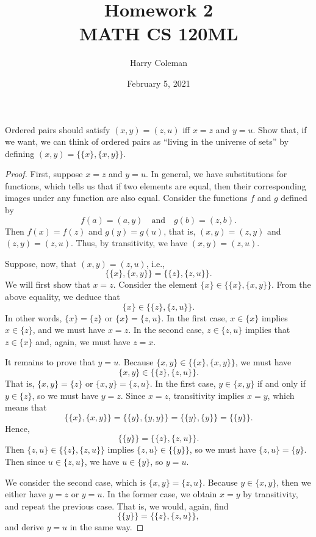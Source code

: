 \documentclass[12pt]{article}
\title{Homework 2\\
    \large MATH CS 120ML
}
\author{Harry Coleman}
\date{February 5, 2021}
\newenvironment{pbox}
    {\begin{lrbox}{\mybox}\begin{minipage}{0.98\textwidth}}
    {\end{minipage}\end{lrbox}\begin{center}\framebox[\textwidth]{\usebox{\mybox}}\end{center}}
\theoremstyle{definition}
\newcommand{\isp}[1]{\quad\text{#1}\quad}
\begin{document}
\maketitle

\section{}
\begin{pbox}
    Ordered pairs should satisfy $(x, y) = (z, u)$ iff $x = z$ and $y = u$. Show that, if we want, we can think of ordered pairs as ``living in the universe of sets'' by defining $(x, y) = \{\{x\}, \{x, y\}\}$.
\end{pbox}

\begin{proof}
    First, suppose $x = z$ and $y = u$. In general, we have substitutions for functions, which tells us that if two elements are equal, then their corresponding images under any function are also equal.  Consider the functions $f$ and $g$ defined by
    \[
        f(a) = (a, y) \isp{and} g(b) = (z, b).
    \]
    Then $f(x) = f(z)$ and $g(y) = g(u)$, that is, $(x, y) = (z, y)$ and $(z, y) = (z, u)$. Thus, by transitivity, we have $(x, y) = (z, u)$.
    
    Suppose, now, that $(x, y) = (z, u)$, i.e.,
    \[
        \{\{x\}, \{x, y\}\} = \{\{z\}, \{z, u\}\}.
    \]
    We will first show that $x = z$. Consider the element $\{x\} \in \{\{x\}, \{x, y\}\}$. From the above equality, we deduce that
    \[
         \{x\} \in \{\{z\}, \{z, u\}\}.
    \]
    In other words, $\{x\} = \{z\}$ or $\{x\} = \{z, u\}$. In the first case, $x \in \{x\}$ implies $x \in \{z\}$, and we must have $x = z$. In the second case, $z \in \{z, u\}$ implies that $z \in \{x\}$ and, again, we must have $z = x$.
    
    It remains to prove that $y = u$. Because $\{x, y\} \in \{\{x\}, \{x, y\}\}$, we must have
    \[
        \{x, y\} \in \{\{z\}, \{z, u\}\}.
    \]
    That is, $\{x, y\} = \{z\}$ or $\{x, y\} = \{z, u\}$. In the first case, $y \in \{x, y\}$ if and only if $y \in \{z\}$, so we must have $y = z$. Since $x = z$, transitivity implies $x = y$, which means that
    \[
        \{\{x\}, \{x, y\}\} = \{\{y\}, \{y, y\}\} = \{\{y\}, \{y\}\} = \{\{y\}\}.
    \]
    Hence,
    \[
        \{\{y\}\} = \{\{z\}, \{z, u\}\}.
    \]
    Then $\{z, u\} \in \{\{z\}, \{z, u\}\}$ implies $\{z, u\} \in \{\{y\}\}$, so we must have $\{z, u\} = \{y\}$. Then since $u \in \{z, u\}$, we have $u \in \{y\}$, so $y = u$.
    
    We consider the second case, which is $\{x, y\} = \{z, u\}$. Because $y \in \{x, y\}$, then we either have $y = z$ or $y = u$. In the former case, we obtain $x = y$ by transitivity, and repeat the previous case. That is, we would, again, find
    \[
        \{\{y\}\} = \{\{z\}, \{z, u\}\},
    \]
    and derive $y = u$ in the same way.
    
\end{proof}
\end{document}
